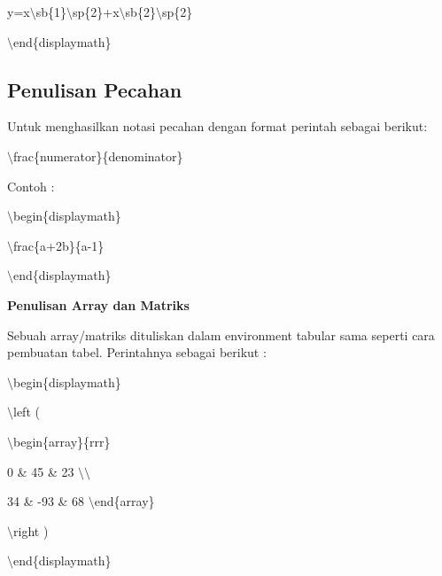 y=x$\setminus$sb\{1\}$\setminus$sp\{2\}+x$\setminus$sb\{2\}$\setminus$sp\{2\}
\par \vspace{12pt}
$\setminus$end\{displaymath\}
\par \vspace{12pt}


\subsection {Penulisan Pecahan}
\par \vspace{12pt}
Untuk menghasilkan notasi pecahan dengan format perintah sebagai berikut:\par \vspace{12pt}

$\setminus$frac\{numerator\}\{denominator\}
\par \vspace{12pt}
Contoh :
\par \vspace{12pt}
$\setminus$begin\{displaymath\}
\par \vspace{12pt}
$\setminus$frac\{a+2b\}\{a-1\}
\par \vspace{12pt}
$\setminus$end\{displaymath\}
\par \vspace{12pt}


\textbf{Penulisan Array dan Matriks}
\par \vspace{12pt}
Sebuah array/matriks dituliskan dalam environment tabular sama seperti cara pembuatan tabel. Perintahnya sebagai berikut :
\par \vspace{12pt}
$\setminus$begin\{displaymath\}
\par \vspace{12pt}
$\setminus$left (
\par \vspace{12pt}
$\setminus$begin\{array\}\{rrr\}
\par \vspace{12pt}
0 \& 45 \& 23 $\setminus$$\setminus$
\par \vspace{12pt}
34 \& -93 \& 68 $\setminus$end\{array\}
\par \vspace{12pt}
$\setminus$right )
\par \vspace{12pt}
$\setminus$end\{displaymath\}
\par \vspace{12pt}


